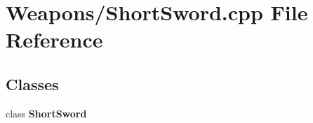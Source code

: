 \section{Weapons/\-Short\-Sword.cpp File Reference}
\label{_short_sword_8cpp}
\subsection*{Classes}
\begin{DoxyCompactItemize}
\item 
class {\bf Short\-Sword}
\end{DoxyCompactItemize}
